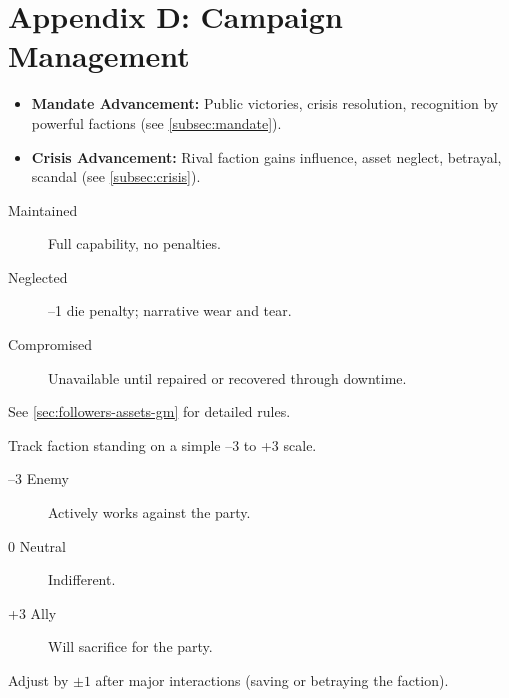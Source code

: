 \clearpage
\section*{Appendix D: Campaign Management}
\label{app:campaign}

\begin{tcolorbox}[title=Campaign Timer Examples, colback=white!97!gray, colframe=black!80!gray,breakable]
\begin{itemize}
  \item \textbf{Mandate Advancement:} Public victories, crisis resolution, recognition by powerful factions (see \ref{subsec:mandate}).
  \item \textbf{Crisis Advancement:} Rival faction gains influence, asset neglect, betrayal, scandal (see \ref{subsec:crisis}).
\end{itemize}
\end{tcolorbox}

\begin{tcolorbox}[title=Follower and Asset Condition States, colback=white!97!gray, colframe=black!80!gray,breakable]
\begin{description}
  \item[Maintained] Full capability, no penalties.
  \item[Neglected] --1 die penalty; narrative wear and tear.
  \item[Compromised] Unavailable until repaired or recovered through downtime.
\end{description}
See \ref{sec:followers-assets-gm} for detailed rules.
\end{tcolorbox}

\begin{tcolorbox}[title=Faction Loyalty Scale (Optional), colback=white!97!gray, colframe=black!80!gray,breakable]
Track faction standing on a simple --3 to +3 scale.
\begin{description}
  \item[--3 Enemy] Actively works against the party.
  \item[0 Neutral] Indifferent.
  \item[+3 Ally] Will sacrifice for the party.
\end{description}
Adjust by \(\pm 1\) after major interactions (saving or betraying the faction).
\end{tcolorbox}

